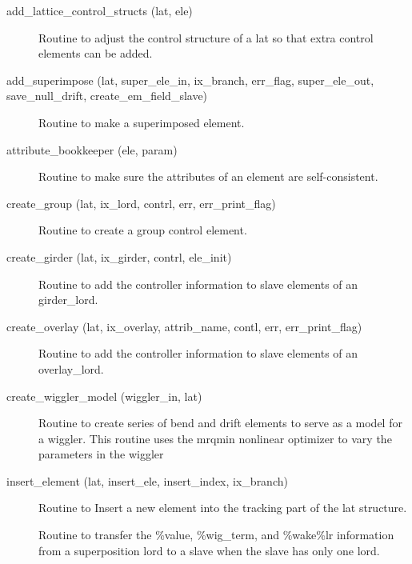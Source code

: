 \begin{description}

\label{r:add.lattice.control.structs}
\item[add_lattice_control_structs (lat, ele)] \Newline 
Routine to adjust the control structure of a lat so that extra control
elements can be added.

\label{r:add.superimpose}
\item[add_superimpose (lat, super_ele_in, ix_branch, err_flag, super_ele_out, save_null_drift, create_em_field_slave)] \Newline
Routine to make a superimposed element. 

\label{r:attribute.bookkeeper}
\item[attribute_bookkeeper (ele, param)] \Newline
Routine to make sure the attributes of an element are self-consistent. 

\label{r:create.group}
\item[create_group (lat, ix_lord, contrl, err, err_print_flag)] \Newline
Routine to create a group control element. 

\label{r:create.girder}
\item[create_girder (lat, ix_girder, contrl, ele_init)] \Newline 
     Routine to add the controller information to slave elements of
     an girder_lord.

\label{r:create.overlay}
\item[create_overlay (lat, ix_overlay, attrib_name, contl, err, err_print_flag)] \Newline
Routine to add the controller information to slave elements of an 
overlay_lord. 

\label{r:create.wiggler.model}
\item[create_wiggler_model (wiggler_in, lat)] \Newline 
Routine to create series of bend and drift elements to serve as a model for a wiggler.
This routine uses the mrqmin nonlinear optimizer to vary the parameters in the wiggler 

\label{r:insert.element}
\item[insert_element (lat, insert_ele, insert_index, ix_branch)] \Newline
Routine to Insert a new element into the tracking part of the 
lat structure. 

\label{r:create.element.slice}
\item[\protect\parbox{6in}{
    create_element_slice (sliced_ele, ele_in, l_slice, offset, param, \\
    \hspace*{1in} at_entrance_end, at_exit_end, err_flag, old_slice)} ] \Newline 
Routine to transfer the \%value, \%wig_term, and \%wake\%lr information from a 
superposition lord to a slave when the slave has only one lord.


\end{description}
